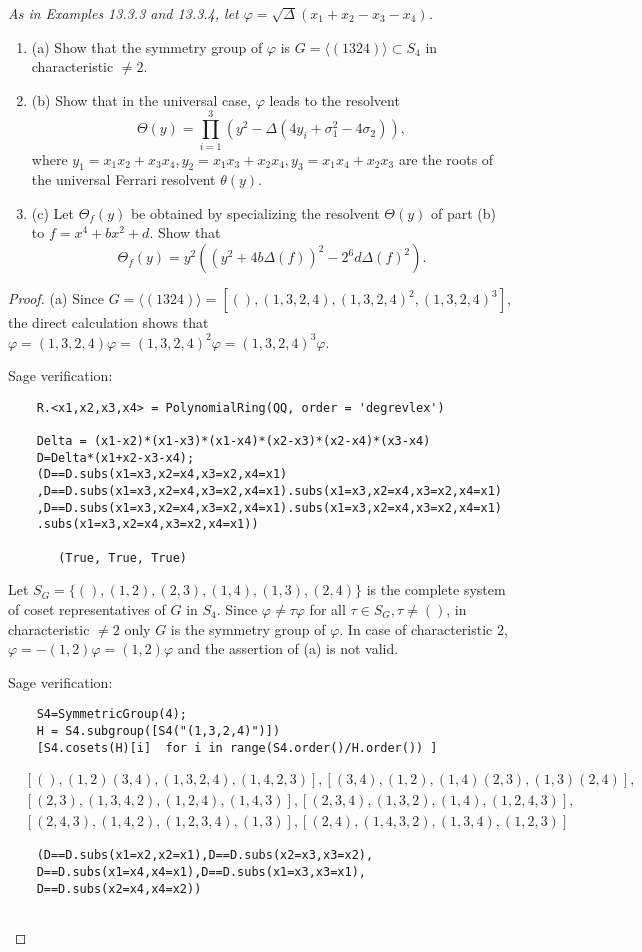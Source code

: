 \documentclass[11pt,a4paper]{article}
\newcommand{\be} {\begin{enumerate}}
\newcommand{\ee} {\end{enumerate}}
\begin{document}
{\it As in Examples 13.3.3 and 13.3.4, let $\varphi=\sqrt{\Delta}(x_1+x_2-x_3-x_4)$.
\be
\item[(a)] Show that the symmetry group of $\varphi$ is $G=\langle(1324)\rangle\subset S_4$ in characteristic $\ne 2$.
\item[(b)] Show that in the universal case, $\varphi$ leads to the resolvent $$\Theta(y)=\prod_{i=1}^3 ( y^2 - \Delta(4y_i+\sigma_1^2-4\sigma_2)) ,$$ where $y_1=x_1x_2+x_3x_4,y_2=x_1x_3+x_2x_4,y_3=x_1x_4+x_2x_3$ are the roots of the universal Ferrari resolvent $\theta(y)$.
\item[(c)] Let $\Theta_f (y)$ be obtained by specializing the resolvent $\Theta (y)$ of part (b) to $f=x^4+bx^2+d$. Show that $$\Theta_f (y)=y^2((y^2+4b\Delta(f))^2-2^6 d\Delta(f)^2). $$
\ee
\begin{proof}
\item[(a)] Since $G=\langle(1324)\rangle=[(), (1,3,2,4), (1,3,2,4)^2, (1,3,2,4)^3]$, the direct calculation shows that $\varphi=(1,3,2,4)\varphi=(1,3,2,4)^2\varphi= (1,3,2,4)^3\varphi$.

Sage verification:
\begin{verbatim}
    R.<x1,x2,x3,x4> = PolynomialRing(QQ, order = 'degrevlex')

    Delta = (x1-x2)*(x1-x3)*(x1-x4)*(x2-x3)*(x2-x4)*(x3-x4)
    D=Delta*(x1+x2-x3-x4);
    (D==D.subs(x1=x3,x2=x4,x3=x2,x4=x1)
    ,D==D.subs(x1=x3,x2=x4,x3=x2,x4=x1).subs(x1=x3,x2=x4,x3=x2,x4=x1)
    ,D==D.subs(x1=x3,x2=x4,x3=x2,x4=x1).subs(x1=x3,x2=x4,x3=x2,x4=x1)
    .subs(x1=x3,x2=x4,x3=x2,x4=x1))
    
       (True, True, True)
\end{verbatim}

Let $S_G=\{(),(1,2),(2,3),(1,4),(1,3),(2,4)\}$ is the complete system of coset representatives of $G$ in $S_4$. Since $\varphi \ne \tau \varphi$ for all $\tau \in S_G, \tau\ne ()$, in characteristic $\ne 2$ only $G$ is the symmetry group of $\varphi$. In case of characteristic $2$, $\varphi = -(1,2) \varphi= (1,2) \varphi$ and the assertion of (a) is not valid. 

Sage verification:
\begin{verbatim}
    S4=SymmetricGroup(4);
    H = S4.subgroup([S4("(1,3,2,4)")])
    [S4.cosets(H)[i]  for i in range(S4.order()/H.order()) ]
\end{verbatim}
\begin{align*}
&[(), (1,2)(3,4), (1,3,2,4), (1,4,2,3)], [(3,4), (1,2), (1,4)(2,3), (1,3)(2,4)],\\
& [(2,3), (1,3,4,2), (1,2,4), (1,4,3)], [(2,3,4), (1,3,2), (1,4), (1,2,4,3)],\\
& [(2,4,3), (1,4,2), (1,2,3,4), (1,3)], [(2,4), (1,4,3,2), (1,3,4), (1,2,3)]
\end{align*}
\begin{verbatim}
    (D==D.subs(x1=x2,x2=x1),D==D.subs(x2=x3,x3=x2),
    D==D.subs(x1=x4,x4=x1),D==D.subs(x1=x3,x3=x1),
    D==D.subs(x2=x4,x4=x2))


\end{verbatim}
\end{proof}}
\end{document}
